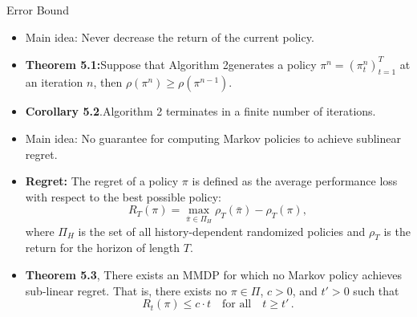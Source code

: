 \begin{block}{Error Bound}

 \begin{itemize}
    \item  \alert{Main idea}: Never decrease the return of the current policy.
  \vspace{0.2cm}
    \item  \textbf{Theorem 5.1:}Suppose that Algorithm 2generates a policy $\pi^n=(\pi_t^n)^T_{t=1}$ at an iteration $n$, then \( \rho(\pi^{n}) \geq \rho(\pi^{n-1}).
     \)
    \item \textbf{Corollary 5.2}.Algorithm 2 terminates in a finite number of iterations. 
     \vspace{0.5cm}
 \end{itemize}   

 \begin{itemize}
     \item \alert{Main idea}: No guarantee for computing Markov policies to achieve sublinear regret.\\
     \vspace{0.2cm}
     \item \textbf{Regret:} The regret of a policy $\pi$ is defined as the average performance loss with respect to the best possible policy:
     \[
     R_T(\pi) = \max_{\bar\pi \in \Pi_H}\rho_T(\bar\pi) - \rho_T(\pi),
     \]
    where $\Pi_{H}$ is the set of all history-dependent randomized policies and $\rho_T$ is the return for the horizon of length $T$. 
    \item \textbf{Theorem 5.3},   There exists an MMDP for which no Markov policy achieves sub-linear regret. That is, there exists no $\pi\in \Pi$, $c>0$, and $t'>0$ such that
     \[
       R_t(\pi) \le c\cdot t \quad \text{for all} \quad  t \ge t'\,.
      \]


\end{itemize}
\end{block}